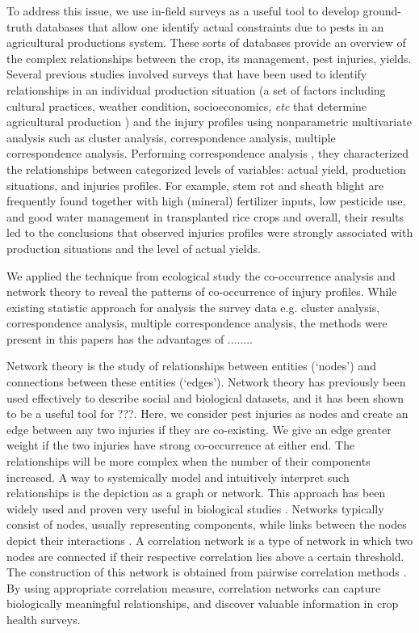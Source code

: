 \documentclass[a4paper]{article}
\begin{document}
To address this issue, we use in-field surveys as a useful tool to develop ground-truth databases that allow one identify actual constraints due to pests in an agricultural productions system. These sorts of databases provide an overview of the complex relationships between the crop, its management, pest injuries, yields. Several previous studies \citep{Savary:2000char, savary2000quanti, savary2005multiple, dong2010characterization, Reddy:2011hl} involved surveys that have been used to identify relationships in an individual production situation (a set of factors including cultural practices, weather condition, socioeconomics, \textit{etc} that determine agricultural production ) and the injury profiles using nonparametric multivariate analysis such as cluster analysis, correspondence analysis, multiple correspondence analysis. Performing correspondence analysis \citep{savary1997new}, they characterized the relationships between categorized levels of variables: actual yield, production situations, and injuries profiles. For example, stem rot and sheath blight are frequently found together with high (mineral) fertilizer inputs, low pesticide use, and good water management in transplanted rice crops and overall, their results led to the conclusions that observed injuries profiles were strongly associated with production situations and the level of actual yields. 

We applied the technique from ecological study the co-occurrence analysis and network theory to reveal the patterns of co-occurrence of injury profiles. While existing statistic approach for analysis the survey data e.g. cluster analysis, correspondence analysis, multiple correspondence analysis, the methods were present in this papers has the advantages of ........

Network theory is the study of relationships between entities (`nodes') and connections between these entities (`edges'). Network theory has previously been used effectively to describe social and biological datasets, and it has been shown to be a useful tool for ???. Here, we consider pest injuries as nodes and create an edge between any two injuries if they are co-existing. We give an edge greater weight if the two injuries have strong co-occurrence at either end.  The relationships will be more complex when the number of their components increased. A way to systemically model and intuitively interpret such relationships is the depiction as a graph or network. This approach has been widely used and proven very useful in biological studies \citep{Lefebvre:2011fo}. Networks typically consist of nodes, usually representing components, while links between the nodes depict their interactions \citep{PROULX:2005hx}. A correlation network is a type of network in which two nodes are connected if their respective correlation lies above a certain threshold. The construction of this network is obtained from pairwise correlation methods \citep{Toubiana:2013cv}. By using appropriate correlation measure, correlation networks can capture biologically meaningful relationships, and discover valuable information in crop health surveys.
\end{document}
